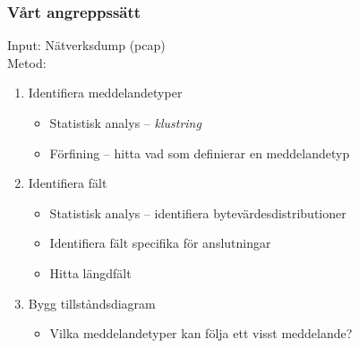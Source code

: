 \documentclass[xetex]{beamer}
\begin{document}
    \begin{frame}
        \frametitle{Vårt angreppssätt}
        Input: Nätverksdump (pcap)\\
        Metod:
        \begin{enumerate}
            \item Identifiera meddelandetyper
                \begin{itemize}
                    \item Statistisk analys -- \emph{klustring}
                    \item Förfining -- hitta vad som definierar en meddelandetyp
                \end{itemize}
            \item Identifiera fält
                \begin{itemize}
                    \item Statistisk analys -- identifiera bytevärdesdistributioner
                    \item Identifiera fält specifika för anslutningar
                    \item Hitta längdfält
                \end{itemize}
            \item Bygg tillståndsdiagram
                \begin{itemize}
                    \item Vilka meddelandetyper kan följa ett visst meddelande?
                \end{itemize}
        \end{enumerate}
    \end{frame}
    
\end{document}
